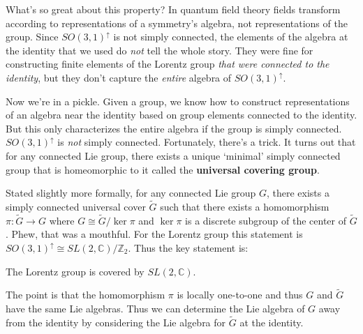 \documentclass[12pt, oneside]{report}    %
\begin{document}
What's so great about this property? In quantum field theory fields transform according to representations of a symmetry's algebra, not representations of the group. Since $SO(3,1)^\uparrow$ is not simply connected, the elements of the algebra at the identity that we used do \textit{not} tell the whole story. They were fine for constructing finite elements of the Lorentz group \textit{that were connected to the identity}, but they don't capture the \textit{entire} algebra of $SO(3,1)^\uparrow$.


Now we're in a pickle. Given a group, we know how to construct representations of an algebra near the identity based on group elements connected to the identity. But this only characterizes the entire algebra if the group is simply connected. $SO(3,1)^\uparrow$ is \textit{not} simply connected. Fortunately, there's a trick. It turns out that for any connected Lie group, there exists a unique `minimal' simply connected group that is homeomorphic to it called the \textbf{universal covering group}. 

Stated slightly more formally, for any connected Lie group $G$, there exists a simply connected universal cover $\tilde{G}$ such that there exists a homomorphism $\pi:\tilde G \to G$ where $G \cong \tilde G/\ker \pi$ and $\ker \pi$ is a discrete subgroup of the center of $\tilde G$. Phew, that was a mouthful. For the Lorentz group this statement is $SO(3,1)^\uparrow \cong SL(2,\mathbb{C})/\mathbb{Z}_2$. Thus the key statement is:
\begin{center}
The Lorentz group is covered by $SL(2,\mathbb{C})$.
\end{center}
The point is that the homomorphism $\pi$ is locally one-to-one and thus $G$ and $\tilde G$ have the same Lie algebras. Thus we can determine the Lie algebra of $G$ away from the identity by considering the  Lie algebra for $\tilde G$ at the identity.
\end{document}

